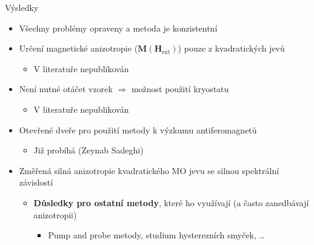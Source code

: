 \documentclass{beamer}
\begin{document}
\begin{frame}{Výsledky}
    \begin{itemize}
        \item Všechny problémy opraveny a metoda je konzistentní
            \pause
        \item Určení magnetické anizotropie ($\bm{M}(\bm{H}_{\textrm{ext}})$) pouze z kvadratických jevů
            \begin{itemize}
                \item V literatuře nepublikován
            \end{itemize}
            \pause
        \item Není nutné otáčet vzorek $\Rightarrow$ možnost použití kryostatu
            \begin{itemize}
                \item V literatuře nepublikován
            \end{itemize}
            \pause
        \item Otevřené dveře pro použití metody k výzkumu antiferomagnetů
            \begin{itemize}
                \item Již probíhá (Zeynab Sadeghi)
            \end{itemize}
            \pause
        \item Změřená silná anizotropie kvadratického MO jevu se silnou spektrální závislostí
            \begin{itemize}
                \item \textbf{Důsledky pro ostatní metody}, které ho využívají (a často zanedbávají anizotropii)
                    \begin{itemize}
                        \item Pump and probe metody, studium hysterezních smyček, \ldots
                    \end{itemize}
            \end{itemize}
    \end{itemize}
\end{frame}

\end{document}
